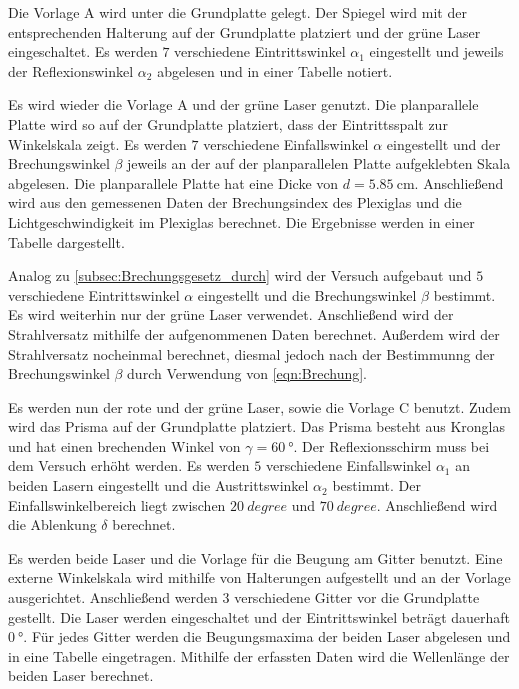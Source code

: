 \label{subsec:Reflexionsgesetz_durch}

Die Vorlage A wird unter die Grundplatte gelegt. Der Spiegel wird mit der entsprechenden Halterung auf der Grundplatte platziert und
der grüne Laser eingeschaltet. Es werden $7$ verschiedene Eintrittswinkel $\alpha_1$ eingestellt und jeweils der Reflexionswinkel $\alpha_2$
abgelesen und in einer Tabelle notiert.

\label{subsec:Brechungsgesetz_durch}

Es wird wieder die Vorlage A und der grüne Laser genutzt. Die planparallele Platte wird so auf der Grundplatte platziert, dass der
Eintrittsspalt zur Winkelskala zeigt.
Es werden $7$ verschiedene Einfallswinkel $\alpha$ eingestellt und der Brechungswinkel $\beta$ jeweils an der auf der planparallelen 
Platte aufgeklebten Skala abgelesen.
Die planparallele Platte hat eine Dicke von $d=\qty{5.85}{\centi\meter}$. Anschließend wird aus den gemessenen Daten der Brechungsindex des Plexiglas und die
Lichtgeschwindigkeit im Plexiglas berechnet. Die Ergebnisse werden in einer Tabelle dargestellt.

\label{subsec:Planparallel_durch}

Analog zu \autoref{subsec:Brechungsgesetz_durch} wird der Versuch aufgebaut und $5$ verschiedene Eintrittswinkel $\alpha$ eingestellt
und die Brechungswinkel $\beta$ bestimmt.
Es wird weiterhin nur der grüne Laser verwendet.
Anschließend wird der Strahlversatz mithilfe der aufgenommenen Daten berechnet.
Außerdem wird der Strahlversatz nocheinmal berechnet, diesmal jedoch nach der Bestimmunng der Brechungswinkel $\beta$ durch Verwendung
von \autoref{eqn:Brechung}. 


\label{subsec:Prisma_durch}
Es werden nun der rote und der grüne Laser, sowie die Vorlage C benutzt. Zudem wird das Prisma auf der Grundplatte platziert.
Das Prisma besteht aus Kronglas und hat einen brechenden Winkel von $\gamma = \qty{60}{\degree}$.
Der Reflexionsschirm muss bei dem Versuch erhöht werden.
Es werden $5$ verschiedene Einfallswinkel $\alpha_1$ an beiden Lasern eingestellt und die Austrittswinkel $\alpha_2$ bestimmt.
Der Einfallswinkelbereich liegt zwischen $\qty{20}{degree}$ und $\qty{70}{degree}$.
Anschließend wird die Ablenkung $\delta$ berechnet.


\label{BeugungGitter_durch}

Es werden beide Laser und die Vorlage für die Beugung am Gitter benutzt.
Eine externe Winkelskala wird mithilfe von Halterungen aufgestellt und an der Vorlage ausgerichtet.
Anschließend werden $3$ verschiedene Gitter vor die Grundplatte gestellt. Die Laser werden eingeschaltet und der
Eintrittswinkel beträgt dauerhaft $\qty{0}{\degree}$. 
Für jedes Gitter werden die Beugungsmaxima der beiden Laser abgelesen und in eine Tabelle eingetragen.
Mithilfe der erfassten Daten wird die Wellenlänge der beiden Laser berechnet.

